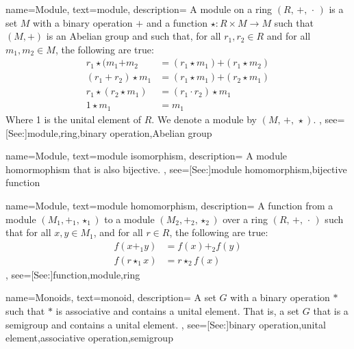 {
    name={Module},
    text={module},
    description={
        A module on a ring $(R,\,+,\,\cdot\,)$ is a set $M$ with a binary
        operation $\boldsymbol{+}$ and a function
        $\star:R\times{M}\rightarrow{M}$ such that $(M,\boldsymbol{+})$ is
        an Abelian group and such that, for all $r_{1},r_{2}\in{R}$ and for
        all $m_{1},m_{2}\in{M}$, the following are true:
        {%
            \begin{align*}
                r_{1}\star(m_{1}\boldsymbol{+}m_{2}
                &=(r_{1}\star{m}_{1})\boldsymbol{+}(r_{1}\star{m}_{2})\\
                (r_{1}+r_{2})\star{m}_{1}
                &=(r_{1}\star{m}_{1})\boldsymbol{+}(r_{2}\star{m}_{1})\\
                r_{1}\star(r_{2}\star{m}_{1})
                &=(r_{1}\cdot{r}_{2})\star{m}_{1}\\
                1\star{m}_{1}&=m_{1}
            \end{align*}
        }
        Where 1 is the unital element of $R$. We denote a module by
        $(M,\,\boldsymbol{+},\,\star)$.
    },
    see=[See:]{module,ring,binary operation,Abelian group}
}

{
    name={Module},
    text={module isomorphism},
    description={
        A module homormophism that is also bijective.
    },
    see=[See:]{module homomorphism,bijective function}
}

{
    name={Module},
    text={module homomorphism},
    description={
        A function from a module $(M_{1},\boldsymbol{+}_{1},\star_{1})$
        to a module $(M_{2},\boldsymbol{+}_{2},\star_{2})$ over a ring
        $(R,\,+,\,\cdot\,)$ such that for all $x,y\in{M}_{1}$, and for all
        $r\in{R}$, the following are true:
        {%
            \begin{align*}
                f(x\boldsymbol{+}_{1}y)&=f(x)\boldsymbol{+}_{2}f(y)\\
                f(r\star_{1}{x})&=r\star_{2}f(x)
            \end{align*}
        }
    },
    see=[See:]{function,module,ring}
}

{
    name={Monoids},
    text={monoid},
    description={
        A set $G$ with a binary operation $*$ such that $*$ is associative and
        contains a unital element. That is, a set $G$ that is a semigroup and
        contains a unital element.
    },
    see=[See:]{binary operation,unital element,associative operation,semigroup}
}

